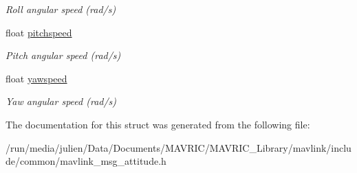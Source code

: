 \begin{DoxyCompactItemize}
\begin{DoxyCompactList}\small\item\em Roll angular speed (rad/s) \end{DoxyCompactList}\item 
\hypertarget{struct____mavlink__attitude__t_a6496f9102154455ef47db7c0cab5c141}{float \hyperlink{struct____mavlink__attitude__t_a6496f9102154455ef47db7c0cab5c141}{pitchspeed}}\label{struct____mavlink__attitude__t_a6496f9102154455ef47db7c0cab5c141}

\begin{DoxyCompactList}\small\item\em Pitch angular speed (rad/s) \end{DoxyCompactList}\item 
\hypertarget{struct____mavlink__attitude__t_a2a6cd5ab90b6c939dec690ebf7000101}{float \hyperlink{struct____mavlink__attitude__t_a2a6cd5ab90b6c939dec690ebf7000101}{yawspeed}}\label{struct____mavlink__attitude__t_a2a6cd5ab90b6c939dec690ebf7000101}

\begin{DoxyCompactList}\small\item\em Yaw angular speed (rad/s) \end{DoxyCompactList}\end{DoxyCompactItemize}


The documentation for this struct was generated from the following file\+:\begin{DoxyCompactItemize}
\item 
/run/media/julien/\+Data/\+Documents/\+M\+A\+V\+R\+I\+C/\+M\+A\+V\+R\+I\+C\+\_\+\+Library/mavlink/include/common/mavlink\+\_\+msg\+\_\+attitude.\+h\end{DoxyCompactItemize}
